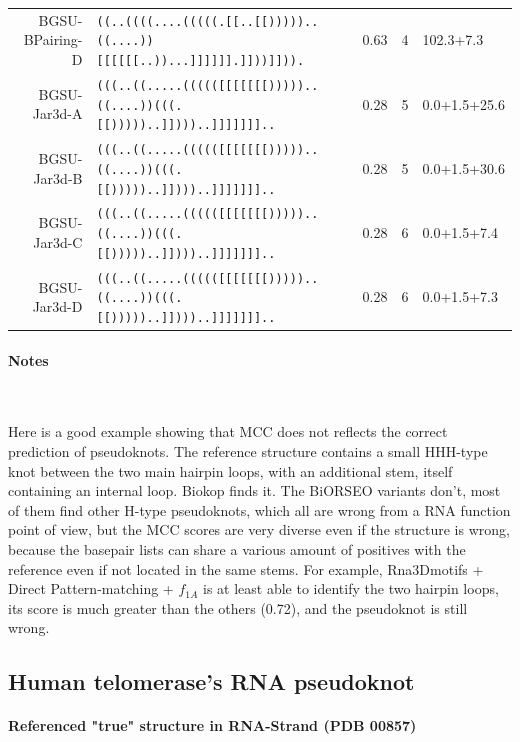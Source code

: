\documentclass{article}
\begin{document}
{\begin{tabular}{rlccl}
BGSU-BPairing-D              &\texttt{((..((((....(((((.[[..[[)))))..((....))[[[[[[..))...]]]]]].]]))]])).} &   0.63  &  4  &     102.3+7.3\\
BGSU-Jar3d-A            &\texttt{(((..((.....((((([[[[[[[)))))..((....))(((.[[)))))..]])))..]]]]]]]..} &   0.28  &  5  &     0.0+1.5+25.6\\
BGSU-Jar3d-B            &\texttt{(((..((.....((((([[[[[[[)))))..((....))(((.[[)))))..]])))..]]]]]]]..} &   0.28  &  5  &     0.0+1.5+30.6\\
BGSU-Jar3d-C            &\texttt{(((..((.....((((([[[[[[[)))))..((....))(((.[[)))))..]])))..]]]]]]]..} &   0.28  &  6  &     0.0+1.5+7.4\\
BGSU-Jar3d-D            &\texttt{(((..((.....((((([[[[[[[)))))..((....))(((.[[)))))..]])))..]]]]]]]..} &   0.28  &  6  &     0.0+1.5+7.3\\

\end{tabular}}

\paragraph{Notes} ~

Here is a good example showing that MCC does not reflects the correct prediction of pseudoknots. The reference structure contains a small HHH-type knot between the two main hairpin loops, with an additional stem, itself containing an internal loop. Biokop finds it. The BiORSEO variants don't, most of them find other H-type pseudoknots, which all are wrong from a RNA function point of view, but the MCC scores are very diverse even if the structure is wrong, because the basepair lists can share a various amount of positives with the reference even if not located in the same stems. For example, Rna3Dmotifs + Direct Pattern-matching + $f_{1A}$ is at least able to identify the two hairpin loops, its score is much greater than the others (0.72), and the pseudoknot is still wrong.


\subsection{Human telomerase's RNA pseudoknot}

\paragraph{Referenced "true" structure in RNA-Strand (PDB 00857)} ~ 
\end{document}
